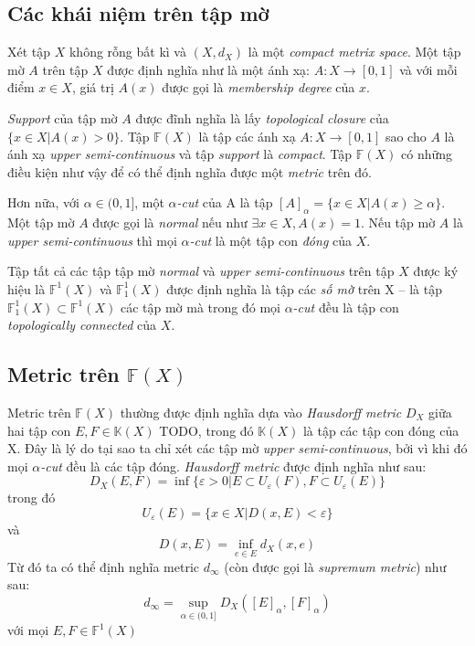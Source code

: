 \documentclass[../report.tex]{subfiles}
\begin{document}
\subsection{Các khái niệm trên tập mờ}
Xét tập $X$ không rỗng bất kì và $(X, d_X)$ là một
\textit{compact metrix space}. Một tập mờ $A$ trên tập $X$ được định nghĩa
như là một ánh xạ: $A: X \rightarrow [0, 1]$ và với mỗi điểm $x \in X$, giá trị 
$A(x)$ được gọi là \textit{membership degree} của $x$.

\textit{Support} của tập mờ $A$ được đĩnh nghĩa là lấy
\textit{topological closure} của $\{ x \in X | A(x) > 0 \}$.
Tập $\mathbb{F}(X)$ là tập các ánh xạ $A: X \rightarrow [0, 1]$ sao cho
$A$ là ánh xạ \textit{upper semi-continuous} và tập \textit{support} là
\textit{compact}. Tập $\mathbb{F}(X)$ có những điều kiện như vậy để có thể 
định nghĩa được một \textit{metric} trên đó.

Hơn nữa, với $\alpha \in (0, 1]$, một \textit{$\alpha$-cut} của A là tập
$[A]_{\alpha} = \{ x \in X | A(x) \ge \alpha\}$.
Một tập mờ $A$ được gọi là \textit{normal} nếu như $\exists x \in X, A(x) = 1$.
Nếu tập mờ $A$ là \textit{upper semi-continuous} thì mọi \textit{$\alpha$-cut} là 
một tập con \textit{đóng} của $X$.

Tập tất cả các tập tập mờ \textit{normal} và \textit{upper semi-continuous} trên 
tập $X$ được ký hiệu là $\mathbb{F}^1(X)$ và $\mathbb{F}_1^1(X)$ được định nghĩa là tập 
các \textit{số mờ} trên X -- là tập $\mathbb{F}_1^1(X) \subset \mathbb{F}^1(X)$
các tập mờ mà trong đó mọi \textit{$\alpha$-cut} đều là tập con
\textit{topologically connected} của $X$.

\subsection{Metric trên $\mathbb{F}(X)$}
Metric trên $\mathbb{F}(X)$ thường được định nghĩa dựa vào \textit{Hausdorff metric}
$D_X$ giữa hai tập con $E, F \in \mathbb{K}(X)$ TODO, trong đó $\mathbb{K}(X)$ là 
tập các tập con đóng của X. Đây là lý do tại sao ta chỉ xét các tập mờ
\textit{upper semi-continuous}, bởi vì khi đó mọi \textit{$\alpha$-cut} đều là các
tập đóng. \textit{Hausdorff metric} được định nghĩa như sau: 
$$
D_X(E, F) = \inf \{\varepsilon > 0 | E \subset U_{\varepsilon}(F), F \subset U_{\varepsilon}(E) \}
$$
trong đó
$$
U_{\varepsilon}(E) = \{ x \in X | D(x, E) < \varepsilon \}
$$
và
$$
D(x, E) = \inf_{e \in E} d_X(x, e)
$$
Từ đó ta có thể định nghĩa metric $d_{\infty}$
(còn được gọi là \textit{supremum metric}) như sau: 
$$
d_{\infty} = \sup_{\alpha \in (0, 1]} D_X([E]_{\alpha}, [F]_{\alpha})
$$
với mọi $E, F \in \mathbb{F}^1(X)$
\end{document}
